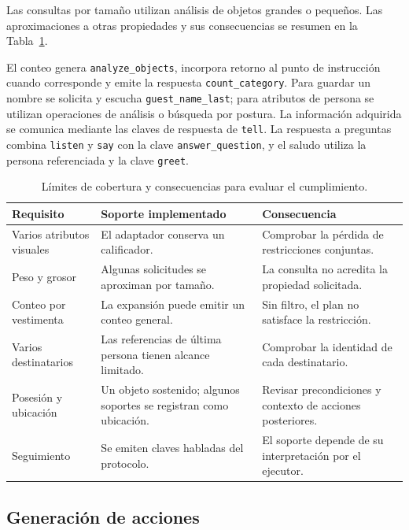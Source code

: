 Las consultas por tamaño utilizan análisis de objetos grandes o pequeños. Las aproximaciones a otras propiedades y sus consecuencias se resumen en la Tabla~\ref{tab:cobertura_impl}.

El conteo genera \texttt{analyze\_\allowbreak objects}, incorpora retorno al punto
de instrucción cuando corresponde y emite la respuesta
\texttt{count\_\allowbreak category}. Para guardar un nombre se solicita y escucha
\texttt{guest\_\allowbreak name\_\allowbreak last}; para atributos de persona se utilizan
operaciones de análisis o búsqueda por postura. La información
adquirida se comunica mediante las claves de respuesta de \texttt{tell}.
La respuesta a preguntas combina \texttt{listen} y \texttt{say} con
la clave \texttt{answer\_\allowbreak question}, y el saludo utiliza la persona
referenciada y la clave \texttt{greet}.

\begin{table}[htbp]
\centering
\small
\caption{Límites de cobertura y consecuencias para evaluar el cumplimiento.}
\label{tab:cobertura_impl}
\begin{tabularx}{\textwidth}{@{}p{}XX@{}}
\toprule
\textbf{Requisito} & \textbf{Soporte implementado} & \textbf{Consecuencia} \\
\midrule
Varios atributos visuales & El adaptador conserva un calificador. & Comprobar la pérdida de restricciones conjuntas. \\
Peso y grosor & Algunas solicitudes se aproximan por tamaño. & La consulta no acredita la propiedad solicitada. \\
Conteo por vestimenta & La expansión puede emitir un conteo general. & Sin filtro, el plan no satisface la restricción. \\
Varios destinatarios & Las referencias de última persona tienen alcance limitado. & Comprobar la identidad de cada destinatario. \\
Posesión y ubicación & Un objeto sostenido; algunos soportes se registran como ubicación. & Revisar precondiciones y contexto de acciones posteriores. \\
Seguimiento & Se emiten claves habladas del protocolo. & El soporte depende de su interpretación por el ejecutor. \\
\bottomrule
\end{tabularx}
\end{table}

\subsection{Generación de acciones}


